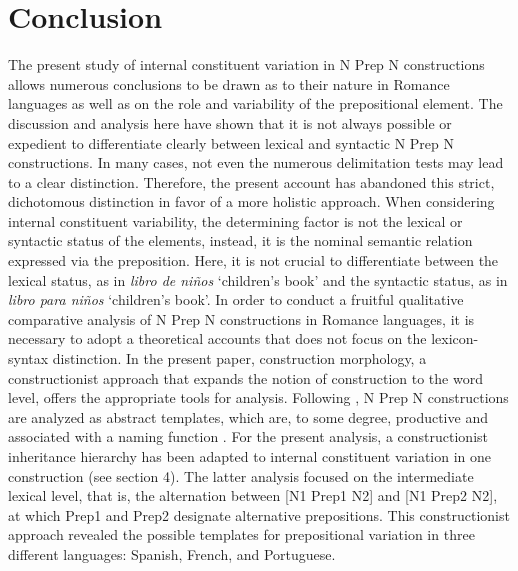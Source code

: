 \documentclass[output=paper]{langsci/langscibook}
\begin{document}
\section {Conclusion}

The present study of internal constituent variation in N Prep N constructions allows numerous conclusions to be drawn as to their nature in Romance languages as well as on the role and variability of the prepositional element. The discussion and analysis here have shown that it is not always possible or expedient to differentiate clearly between lexical and syntactic N Prep N constructions. In many cases, not even the numerous delimitation tests may lead to a clear distinction. Therefore, the present account has abandoned this strict, dichotomous distinction in favor of a more holistic approach. When considering internal constituent variability, the determining factor is not the lexical or syntactic status of the elements, instead, it is the nominal semantic relation expressed via the preposition. Here, it is not crucial to differentiate between the lexical status, as in \textit{libro de niños }`children’s book' and the syntactic status, as in \textit{libro para niños} `children’s book'. In order to conduct a fruitful qualitative comparative analysis of N Prep N constructions in Romance languages, it is necessary to adopt a theoretical accounts that does not focus on the lexicon-syntax distinction. In the present paper, construction morphology, a constructionist approach that expands the notion of construction to the word level, offers the appropriate tools for analysis. Following \citet{Masini:2009}, N Prep N constructions are analyzed as abstract templates, which are, to some degree, productive and associated with a naming function  \citep [261]{Masini:2009}. For the present analysis, a constructionist inheritance hierarchy has been adapted to internal constituent variation in one construction (see section 4). The latter analysis focused on the intermediate lexical level, that is, the alternation between [N1 Prep1 N2] and [N1 Prep2 N2], at which Prep1 and Prep2 designate alternative prepositions. This constructionist approach revealed the possible templates for prepositional variation in three different languages: Spanish, French, and Portuguese. 
\end{document}
